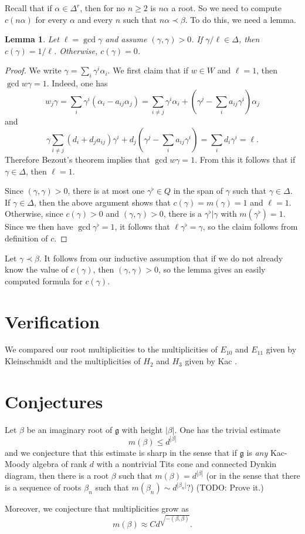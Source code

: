 \documentclass[12pt]{report}
\newcommand{\g}{\mathfrak g}
\newtheorem{lemma}[theorem]{Lemma}
\theoremstyle{definition}
\begin{document}
Recall that if $\alpha \in \Delta^r$, then for no $n \geq 2$ is $n \alpha$ a root. So we need to compute $c(n\alpha)$ for every $\alpha$ and every $n$ such that $n \alpha \prec \beta$. To do this, we need a lemma.
\begin{lemma}
	Let $\ell = \gcd \gamma$ and assume $(\gamma, \gamma) > 0$. If $\gamma/\ell \in \Delta$, then $c(\gamma) = 1/\ell$. Otherwise, $c(\gamma) = 0$.
\end{lemma}
\begin{proof}
	We write $\gamma = \sum_i \gamma^i \alpha_i$. We first claim that if $w \in W$ and $\ell = 1$, then $\gcd w\gamma = 1$. Indeed, one has
	$$w_j\gamma = \sum_i \gamma^i (\alpha_i - a_{ij} \alpha_j) = \sum_{i \neq j} \gamma^i \alpha_i + (\gamma^j - \sum_i a_{ij} \gamma^i) \alpha_j$$
	and
	$$\gamma \sum_{i\neq j} (d_i + d_j a_{ij}) \gamma^i + d_j \left(\gamma^j - \sum_i a_{ij} \gamma^i\right) = \sum_i d_i \gamma^i = \ell.$$
	Therefore Bezout's theorem implies that $\gcd w\gamma = 1$. From this it follows that if $\gamma \in \Delta$, then $\ell = 1$.

	Since $(\gamma, \gamma) > 0$, there is at most one $\gamma^\flat \in Q$ in the span of $\gamma$ such that $\gamma \in \Delta$. If $\gamma \in \Delta$, then the above argument shows that $c(\gamma) = m(\gamma) = 1$ and $\ell = 1$. Otherwise, since $c(\gamma) > 0$ and $(\gamma, \gamma) > 0$, there is a $\gamma^\flat|\gamma$ with $m(\gamma^\flat) = 1$. Since we then have $\gcd \gamma^\flat = 1$, it follows that $\ell \gamma^\flat = \gamma$, so the claim follows from definition of $c$.
\end{proof}
Let $\gamma \prec \beta$. It follows from our inductive assumption that if we do not already know the value of $c(\gamma)$, then $(\gamma, \gamma) > 0$, so the lemma gives an easily computed formula for $c(\gamma)$.












\section{Verification}
We compared our root multiplicities to the multiplicities of $E_{10}$ and $E_{11}$ given by Kleinschmidt \cite{kleinschmidt2004e11} and the multiplicities of $H_2$ and $H_3$ given by Kac \cite{kac_2014}.


\section{Conjectures}
Let $\beta$ be an imaginary root of $\g$ with height $|\beta|$. One has the trivial estimate
$$m(\beta) \leq d^{|\beta|}$$
and we conjecture that this estimate is sharp in the sense that if $\g$ is \emph{any} Kac-Moody algebra of rank $d$ with a nontrivial Tits cone and connected Dynkin diagram, then there is a root $\beta$ such that $m(\beta) = d^{|\beta|}$ (or in the sense that there is a sequence of roots $\beta_n$ such that $m(\beta_n) \sim d^{|\beta_n|}$?) (TODO: Prove it.)

Moreover, we conjecture that multiplicities grow as
$$m(\beta) \approx Cd^{\sqrt{-(\beta, \beta)}}.$$



{}

\end{document}
